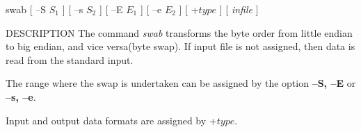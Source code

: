 % 
% 
% 
% 
%                                                                        
%

\begin{synopsis}
\item [swab] [ --S $S_1$ ] [ --s $S_2$ ] [ --E $E_1$ ] [ --e $E_2$ ] 
 	    [ +$type$ ] [ {\em infile} ] 
\end{synopsis}

\begin{qsection}{DESCRIPTION}
The command {\em swab} transforms the byte order from
little endian to big endian, and vice versa(byte swap).
If input file is not assigned, then data is read from
the standard input.
\par
The range where the swap is undertaken can be assigned by
the option {\bf --S, --E} or {\bf --s, --e}.
\par
Input and output data formats are assigned by +$type$.
\end{qsection}

